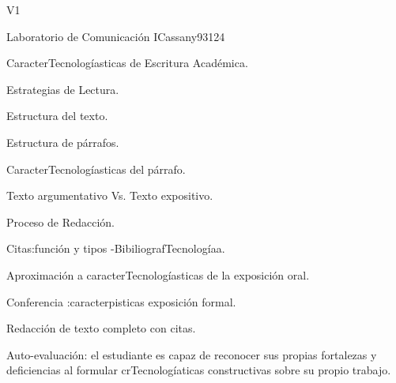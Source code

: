 \begin{syllabus}
\begin{competences}{V1}
    \item {}
    \item {}
    \item {}
\end{competences}

\begin{unit}{Laboratorio de Comunicación I}{}{Cassany93}{12}{4}
   \begin{topics}
      \item CaracterTecnologíasticas de Escritura Académica.
      \item Estrategias de Lectura.
      \item Estructura del texto.
      \item Estructura de párrafos.
      \item CaracterTecnologíasticas del párrafo.
      \item Texto argumentativo Vs. Texto expositivo.
      \item Proceso de Redacción.
      \item Citas:función y tipos -BibiliografTecnologíaa.
      \item Aproximación a caracterTecnologíasticas de la exposición oral.
      \item Conferencia :caracterpisticas exposición formal.
      \item Redacción de texto completo con citas.  
   \end{topics}
   \begin{learningoutcomes}
      \item Auto-evaluación: el estudiante es capaz de reconocer sus propias fortalezas y deficiencias al formular crTecnologíaticas constructivas sobre su propio trabajo.
   \end{learningoutcomes}
\end{unit}

\begin{coursebibliography}
\end{coursebibliography}

\end{syllabus}
